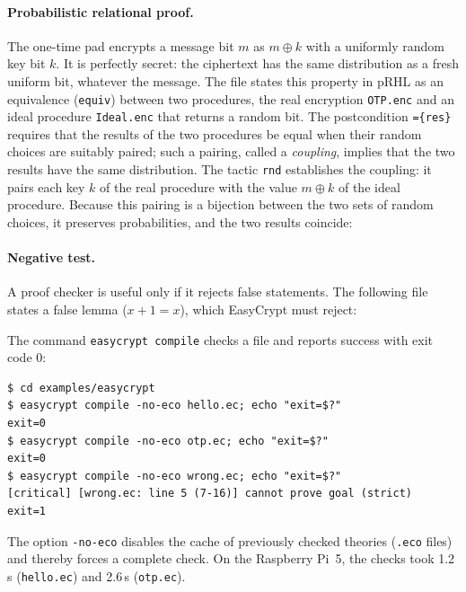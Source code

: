\documentclass[11pt,a4paper]{article}
\newcommand{\file}[1]{\texttt{#1}}
\begin{document}
\paragraph{Probabilistic relational proof.} The one-time pad encrypts a
message bit \(m\) as \(m \oplus k\) with a uniformly random key bit \(k\).
It is perfectly secret: the ciphertext has the same distribution as a fresh
uniform bit, whatever the message. The file states this property in pRHL as
an equivalence (\texttt{equiv}) between two procedures, the real encryption
\texttt{OTP.enc} and an ideal procedure \texttt{Ideal.enc} that returns a
random bit. The postcondition \texttt{=\{res\}} requires that the results of
the two procedures be equal when their random choices are suitably paired;
such a pairing, called a \emph{coupling}, implies that the two results have
the same distribution. The tactic \texttt{rnd} establishes the coupling: it
pairs each key \(k\) of the real procedure with the value \(m \oplus k\) of
the ideal procedure. Because this pairing is a bijection between the two
sets of random choices, it preserves probabilities, and the two results
coincide:



\paragraph{Negative test.} A proof checker is useful only if it rejects
false statements. The following file states a false lemma ($x + 1 = x$),
which EasyCrypt must reject:



The command \texttt{easycrypt compile} checks a file and reports success
with exit code 0:

\begin{lstlisting}[style=shell]
$ cd examples/easycrypt
$ easycrypt compile -no-eco hello.ec; echo "exit=$?"
exit=0
$ easycrypt compile -no-eco otp.ec; echo "exit=$?"
exit=0
$ easycrypt compile -no-eco wrong.ec; echo "exit=$?"
[critical] [wrong.ec: line 5 (7-16)] cannot prove goal (strict)
exit=1
\end{lstlisting}

The option \texttt{-no-eco} disables the cache of previously checked
theories (\texttt{.eco} files) and thereby forces a complete check. On the
Raspberry Pi~5, the checks took 1.2\,s (\file{hello.ec}) and 2.6\,s
(\file{otp.ec}).
\end{document}
